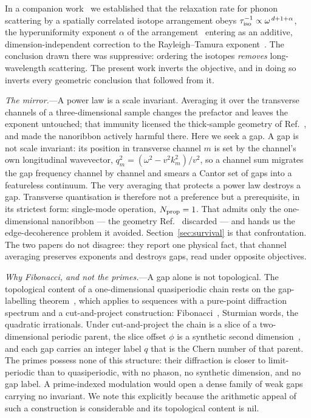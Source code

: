 \documentclass[aps,prl,preprint,superscriptaddress,longbibliography]{revtex4-2}
\begin{document}
In a companion work~\cite{paper1} we established that the relaxation rate for
phonon scattering by a spatially correlated isotope arrangement obeys
$\tau^{-1}_{\rm iso} \propto \omega^{\,d+1+\alpha}$, the hyperuniformity
exponent $\alpha$ of the arrangement~\cite{torquato2003} entering as an
additive, dimension-independent correction to the Rayleigh--Tamura
exponent~\cite{tamura1983}. The conclusion drawn there was suppressive:
ordering the isotopes \emph{removes} long-wavelength scattering. The present
work inverts the objective, and in doing so inverts every geometric
conclusion that followed from it.

\emph{The mirror.}---A power law is a scale invariant. Averaging it over the
transverse channels of a three-dimensional sample changes the prefactor and
leaves the exponent untouched; that immunity licensed the thick-sample
geometry of Ref.~\cite{paper1}, and made the nanoribbon actively harmful
there. Here we seek a gap. A gap is not scale invariant: its position in
transverse channel $m$ is set by the channel's own longitudinal wavevector,
$q_m^2 = (\omega^2 - v^2 k_m^2)/v^2$, so a channel sum migrates the gap
frequency channel by channel and smears a Cantor set of gaps into a
featureless continuum. The very averaging that protects a power law destroys
a gap. Transverse quantisation is therefore not a preference but a
prerequisite, in its strictest form: single-mode operation,
$N_{\rm prop} = 1$. That admits only the one-dimensional nanoribbon --- the
geometry Ref.~\cite{paper1} discarded --- and hands us the edge-decoherence
problem it avoided. Section~\ref{sec:survival} is that confrontation. The two
papers do not disagree: they report one physical fact, that channel averaging
preserves exponents and destroys gaps, read under opposite objectives.

\emph{Why Fibonacci, and not the primes.}---A gap alone is not topological.
The topological content of a one-dimensional quasiperiodic chain rests on the
gap-labelling theorem~\cite{bellissard1992}, which applies to sequences with
a pure-point diffraction spectrum and a cut-and-project construction:
Fibonacci~\cite{kohmoto1983,ostlund1983}, Sturmian words, the quadratic
irrationals. Under cut-and-project the chain is a slice of a two-dimensional
periodic parent, the slice offset $\phi$ is a synthetic second
dimension~\cite{kraus2012}, and each gap carries an integer label $q$ that is
the Chern number of that parent. The primes possess none of this structure:
their diffraction is closer to limit-periodic than to quasiperiodic, with no
phason, no synthetic dimension, and no gap label. A prime-indexed modulation
would open a dense family of weak gaps carrying no invariant. We note this
explicitly because the arithmetic appeal of such a construction is
considerable and its topological content is nil.
\end{document}
